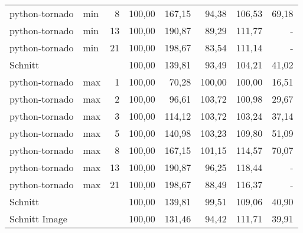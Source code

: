 \begin{footnotesize}
\begin{longtable}{llrrrrrr}
		python-tornado & min     & 8          & 100,00 & 167,15                      & 94,38                       & 106,53                      & 69,18                       \\
		python-tornado & min     & 13         & 100,00 & 190,87                      & 89,29                       & 111,77                      & -                           \\
		python-tornado & min     & 21         & 100,00 & 198,67                      & 83,54                       & 111,14                      & -                           \\ \hline
		Schnitt        &         &            & 100,00 & 139,81                      & 93,49                       & 104,21                      & 41,02                       \\ \hline
		python-tornado & max     & 1          & 100,00 & 70,28                       & \cellcolor[HTML]{C0C0C0}100,00 & \cellcolor[HTML]{C0C0C0}100,00 & 16,51                       \\
		python-tornado & max     & 2          & 100,00 & 96,61                       & 103,72                      & 100,98                      & 29,67                       \\
		python-tornado & max     & 3          & 100,00 & 114,12                      & 103,72                      & 103,24                      & 37,14                       \\
		python-tornado & max     & 5          & 100,00 & 140,98                      & 103,23                      & 109,80                      & 51,09                       \\
		python-tornado & max     & 8          & 100,00 & 167,15                      & 101,15                      & 114,57                      & 70,07                       \\
		python-tornado & max     & 13         & 100,00 & 190,87                      & 96,25                       & 118,44                      & -                           \\
		python-tornado & max     & 21         & 100,00 & 198,67                      & 88,49                       & 116,37                      & -                           \\ \hline
		Schnitt        &         &            & 100,00 & 139,81                      & 99,51                       & 109,06                      & 40,90                       \\ \hline
		\multicolumn{2}{l}{Schnitt Image} &            & 100,00 & 131,46                      & 94,42                       & 111,71                      & 39,91                       \\ \hline

\end{longtable}
\end{footnotesize}
